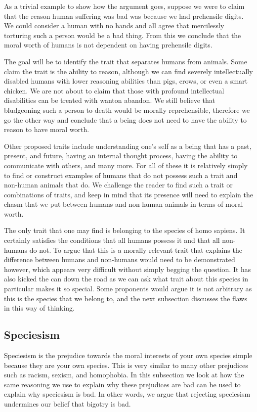 As a trivial example to show how the argument goes, suppose we were to claim that the reason human suffering was bad was because we had prehensile digits. We could consider a human with no hands and all agree that mercilessly torturing such a person would be a bad thing. From this we conclude that the moral worth of humans is not dependent on having prehensile digits.

The goal will be to identify the trait that separates humans from animals. Some claim the trait is the ability to reason, although we can find severely intellectually disabled humans with lower reasoning abilities than pigs, crows, or even a smart chicken. We are not about to claim that those with profound intellectual disabilities can be treated with wanton abandon. We still believe that bludgeoning such a person to death would be morally reprehensible, therefore we go the other way and conclude that a being does not need to have the ability to reason to have moral worth.

Other proposed traits include understanding one's self as a being that has a past, present, and future, having an internal thought process, having the ability to communicate with others, and many more. For all of these it is relatively simply to find or construct examples of humans that do not possess such a trait and non-human animals that do. We challenge the reader to find such a trait or combinations of traits, and keep in mind that its presence will need to explain the chasm that we put between humans and non-human animals in terms of moral worth.

The only trait that one may find is belonging to the species of homo sapiens. It certainly satisfies the conditions that all humans possess it and that all non-humans do not. To argue that this is a morally relevant trait that explains the difference between humans and non-humans would need to be demonstrated however, which appears very difficult without simply begging the question. It has also kicked the can down the road as we can ask what trait about this species in particular makes it so special. Some proponents would argue it is not arbitrary as this is the species that we belong to, and the next subsection discusses the flaws in this way of thinking.

\subsection{Speciesism}

Speciesism is the prejudice towards the moral interests of your own species simple because they are your own species. This is very similar to many other prejudices such as racism, sexism, and homophobia. In this subsection we look at how the same reasoning we use to explain why these prejudices are bad can be used to explain why speciesism is bad. In other words, we argue that rejecting speciesism undermines our belief that bigotry is bad.


